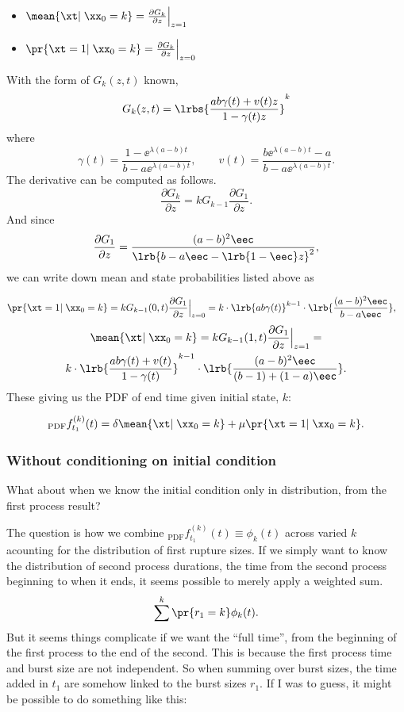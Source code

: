 \begin{itemize}
\item $\mean{\xt|\;\xx_0 = k} = \frac{\partial G_k}{\partial z}\Big\rvert_{z=1}$
\item $  \pr{\xt = 1 | \; \xx_0 = k} = \frac{\partial G_k}{\partial z}\Big\rvert_{z=0}$ 
\end{itemize}
With the form of $G_k(z,t)$ known, 
$$G_k(z,t) = \lrbs{\frac{ab\gamma(t) + v(t)z}{1- \gamma(t)z}}^k$$
where
$$\gamma(t) = \frac{1 - \ee^{\lambda(a-b)t}}{b - a\ee^{\lambda(a-b)t}}, \quad\quad v(t) = \frac{b\ee^{\lambda(a-b)t} -a}{b - a\ee^{\lambda(a-b)t}}.$$
The derivative can be computed as follows.
$$ \frac{\partial G_k}{\partial z} = kG_{k-1}  \frac{\partial G_1}{\partial z}.$$
And since 
$$ \frac{\partial G_1}{\partial z} = \frac{(a-b)^2 \eec}{\lrb{b-a\eec- \lrb{1 - \eec }z}^2},$$
we can write down mean and state probabilities listed above as 

\begin{align*}
\pr{\xt = 1 | \; \xx_0 = k}  &=  kG_{k-1}(0, t)  \frac{\partial G_1}{\partial z}\Big\rvert_{z=0} =  k\cdot    \lrb{ab\gamma(t)}^{k-1} \cdot \lrb{\frac{(a-b)^2 \eec}{b - a \eec}},
\end{align*} 
\begin{multline*}
\mean{\xt|\;\xx_0 = k} = kG_{k-1}(1, t)  \frac{\partial G_1}{\partial z}\Big\rvert_{z=1}  = \\k\cdot \lrb{\frac{ab\gamma(t) + v(t)}{1 - \gamma(t)} }^{k-1} \cdot \lrb{\frac{(a-b)^2\eec}{(b-1)+(1-a)\eec}}.
\end{multline*} 
These giving us the PDF of end time given initial state, $k$:

$$_{\text{PDF}}f^{(k)}_{t_1} (t) =  \delta \mean{\xt|\;\xx_0 = k} + \mu\pr{\xt = 1 | \; \xx_0 = k}. $$

\subsubsection*{Without conditioning on initial condition}
What about when we know the initial condition only in distribution, from the first process result?\par
The question is how we combine $_{\text{PDF}}f^{(k)}_{t_1}(t)  \equiv \phi_k(t)$ across varied $k$ acounting for the distribution of first rupture sizes. If we simply want to know the distribution of second process durations, the time from the second process beginning to when it ends, it seems possible to merely apply a weighted sum. 
$$\sum^{k} \pr{r_1 = k}\phi_k(t).$$
But it seems things complicate if we want the ``full time'', from the beginning of the first process to the end of the second. This is because the first process time and burst size are not independent. So when summing over burst sizes, the time added in $t_1$ are somehow linked to the burst sizes $r_1$. If I was to guess, it might be possible to do something like this:

